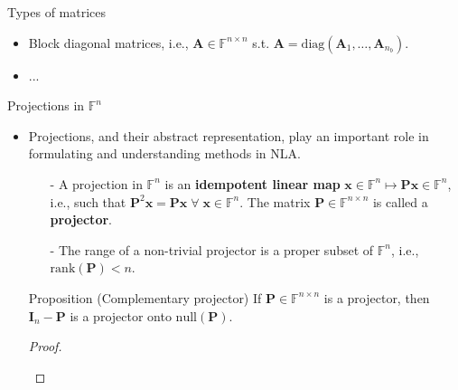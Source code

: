\documentclass[t,usepdftitle=false]{beamer}
\begin{document}
\begin{frame}{Types of matrices}
\begin{itemize}
\begin{itemize}
\item[-] Lower Hessenberg matrices: 
\hspace{.72cm}{\color{blue}-} Upper Hessenberg matrices: 
\end{itemize}
\vspace{.075cm}
\item Block diagonal matrices, i.e., $\mathbf{A}\in\mathbb{F}^{n\times n}$ s.t.$\!$ $\mathbf{A}=\mathrm{diag}(\mathbf{A}_1,\dots,\mathbf{A}_{n_b})$.
\item ...
\end{itemize}
\end{frame}

\begin{frame}{Projections in $\mathbb{F}^n$}
\begin{itemize}
\vspace{-.03cm}
\item Projections, and their abstract representation, play an important role in formulating and understanding methods in NLA.\vspace{-.125cm}
\begin{definition}
\begin{itemize}
\item[-]A projection in $\mathbb{F}^n$ is an \textbf{idempotent linear map} $\mathbf{x}\in\mathbb{F}^n\mapsto\mathbf{P}\mathbf{x}\in\mathbb{F}^n$, i.e., such that $\mathbf{P}^2\mathbf{x}=\mathbf{P}\mathbf{x}\;\forall\;\mathbf{x}\in\mathbb{F}^{n}$.
The matrix $\mathbf{P}\in\mathbb{F}^{n\times n}$ is called a \textbf{projector}.\vspace{-.1cm}
\item[-]The range of a non-trivial projector is a proper subset of $\mathbb{F}^n$, i.e., $\mathrm{rank}(\mathbf{P})<n$. 
\end{itemize}
\end{definition}
\vspace{-.175cm}
\begin{block}{Proposition (Complementary projector)}
If $\mathbf{P}\in\mathbb{F}^{n\times n}$ is a projector, then $\mathbf{I}_n-\mathbf{P}$ is a projector onto $\mathrm{null}(\mathbf{P})$.
\end{block}
\vspace{-.175cm}
\begin{proof}
\begin{itemize}

\end{itemize}
\end{proof}
\end{itemize}
\end{frame}
\end{document}
